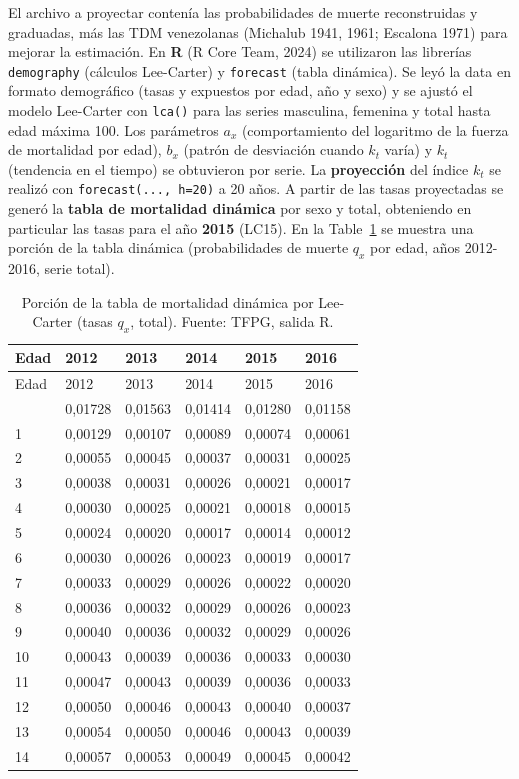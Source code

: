\documentclass[
  11pt,
  a4paper,
]{article}
\begin{document}
El archivo a proyectar contenía las probabilidades de muerte
reconstruidas y graduadas, más las TDM venezolanas (Michalub 1941, 1961;
Escalona 1971) para mejorar la estimación. En \textbf{R} (R Core Team,
2024) se utilizaron las librerías \texttt{demography} (cálculos
Lee-Carter) y \texttt{forecast} (tabla dinámica). Se leyó la data en
formato demográfico (tasas y expuestos por edad, año y sexo) y se ajustó
el modelo Lee-Carter con \texttt{lca()} para las series masculina,
femenina y total hasta edad máxima 100. Los parámetros \(a_x\)
(comportamiento del logaritmo de la fuerza de mortalidad por edad),
\(b_x\) (patrón de desviación cuando \(k_t\) varía) y \(k_t\) (tendencia
en el tiempo) se obtuvieron por serie. La \textbf{proyección} del índice
\(k_t\) se realizó con \texttt{forecast(...,\ h=20)} a 20 años. A partir
de las tasas proyectadas se generó la \textbf{tabla de mortalidad
dinámica} por sexo y total, obteniendo en particular las tasas para el
año \textbf{2015} (LC15). En la Table~\ref{tbl-lc-porcion} se muestra
una porción de la tabla dinámica (probabilidades de muerte \(q_x\) por
edad, años 2012-2016, serie total).

\begin{longtable}[]{@{}llllll@{}}
\caption{Porción de la tabla de mortalidad dinámica por Lee-Carter
(tasas \(q_x\), total). Fuente: TFPG, salida
R.}\label{tbl-lc-porcion}\tabularnewline
\toprule\noalign{}
Edad & 2012 & 2013 & 2014 & 2015 & 2016 \\
\midrule\noalign{}
\endfirsthead
\toprule\noalign{}
Edad & 2012 & 2013 & 2014 & 2015 & 2016 \\
\midrule\noalign{}
\endhead
\bottomrule\noalign{}
\endlastfoot
0 & 0,01728 & 0,01563 & 0,01414 & 0,01280 & 0,01158 \\
1 & 0,00129 & 0,00107 & 0,00089 & 0,00074 & 0,00061 \\
2 & 0,00055 & 0,00045 & 0,00037 & 0,00031 & 0,00025 \\
3 & 0,00038 & 0,00031 & 0,00026 & 0,00021 & 0,00017 \\
4 & 0,00030 & 0,00025 & 0,00021 & 0,00018 & 0,00015 \\
5 & 0,00024 & 0,00020 & 0,00017 & 0,00014 & 0,00012 \\
6 & 0,00030 & 0,00026 & 0,00023 & 0,00019 & 0,00017 \\
7 & 0,00033 & 0,00029 & 0,00026 & 0,00022 & 0,00020 \\
8 & 0,00036 & 0,00032 & 0,00029 & 0,00026 & 0,00023 \\
9 & 0,00040 & 0,00036 & 0,00032 & 0,00029 & 0,00026 \\
10 & 0,00043 & 0,00039 & 0,00036 & 0,00033 & 0,00030 \\
11 & 0,00047 & 0,00043 & 0,00039 & 0,00036 & 0,00033 \\
12 & 0,00050 & 0,00046 & 0,00043 & 0,00040 & 0,00037 \\
13 & 0,00054 & 0,00050 & 0,00046 & 0,00043 & 0,00039 \\
14 & 0,00057 & 0,00053 & 0,00049 & 0,00045 & 0,00042 \\
\end{longtable}
\end{document}
